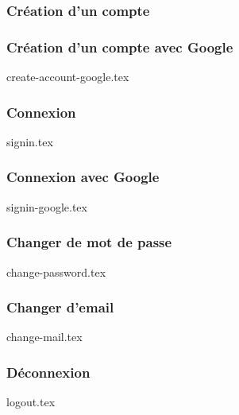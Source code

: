 \subsubsection{Création d'un compte}

\subsubsection{Création d'un compte avec Google}
{create-account-google.tex}

\subsubsection{Connexion}
{signin.tex}

\subsubsection{Connexion avec Google}
{signin-google.tex}

\subsubsection{Changer de mot de passe}
{change-password.tex}

\subsubsection{Changer d'email}
{change-mail.tex}

\subsubsection{Déconnexion}
{logout.tex}